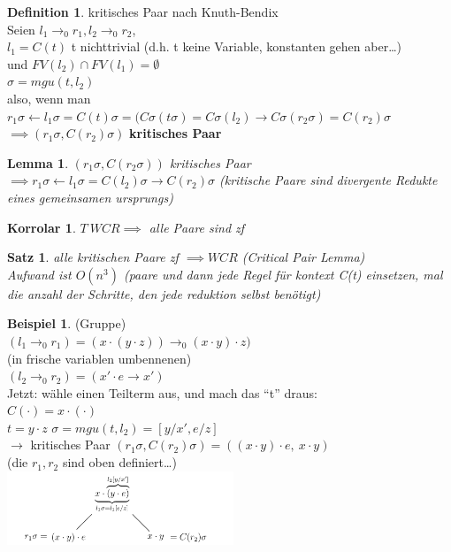 \documentclass{article}
\newtheorem{satz}{Satz}
\newtheorem{korrolar}{Korrolar}[section]
\newtheorem{lemma}{Lemma}[section]
\theoremstyle{definition}
\newtheorem{beispiel}{Beispiel}[section]
\newtheorem{definition}{Definition}[section]
\begin{document}
	\begin{definition}kritisches Paar nach Knuth-Bendix\\
	Seien $l_1\to_0 r_1, l_2\to_0 r_2$,\\
	$l_1 = C(t)$ t nichttrivial (d.h. t keine Variable, konstanten gehen aber\dots)\\
	und $FV(l_2)\cap FV(l_1)=\emptyset$\\
	$\sigma = mgu(t,l_2)$\\
	also, wenn man $r_1\sigma\gets l_1\sigma = C(t)\sigma =( C\sigma(t\sigma) = C\sigma(l_2)\to C\sigma(r_2\sigma)=C(r_2)\sigma$\\
	$\implies (r_1\sigma, C(r_2)\sigma)$  \textbf{kritisches Paar}
	\end{definition}
	\begin{lemma} $(r_1\sigma, C(r_2\sigma))$ kritisches Paar\label{critical pair}\\
	$\implies r_1\sigma\gets l_1\sigma =C(l_2)\sigma \to C(r_2)\sigma$ (kritische Paare sind divergente Redukte eines gemeinsamen ursprungs)
	\end{lemma}
	\begin{korrolar}$T\ WCR\implies$ alle Paare sind zf
	\end{korrolar}
	\begin{satz} alle kritischen Paare zf $\implies WCR$ (Critical Pair Lemma)\label{critical pair lemma}\\
	Aufwand ist $O(n^3)$ (paare und dann jede Regel für kontext C(t) einsetzen, mal die anzahl der Schritte, den jede reduktion selbst benötigt)\\
	\end{satz}
	\begin{beispiel} (Gruppe)\\
	$(l_1\to_0 r_1) = (x\cdot (y\cdot z))\to_0 (x\cdot y)\cdot z)$\\
	(in frische variablen umbennenen)\\
	$(l_2\to_0 r_2) = (x'\cdot e\to x')$\\
	Jetzt: wähle einen Teilterm aus, und mach das ``t'' draus:\\
	$C(\cdot) = x\cdot(\cdot)$\\
	$t=y\cdot z$ $\sigma=mgu(t,l_2) = [y/x',e/z]$\\
	$\to$ kritisches Paar $(r_1\sigma, C(r_2)\sigma) = ((x\cdot y)\cdot e,\ x\cdot y)$\\
	(die $r_1,r_2$ sind oben definiert\dots)\\
	\includegraphics[width=256px]{images/criticalPairs.png}\\
	\end{beispiel}
\end{document}
